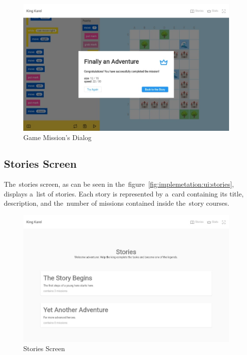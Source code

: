 \begin{figure}
    \centering
    \includegraphics[width=1\linewidth]{assets/implementation/ui/kingkarel_game_mission_dialog.jpeg}
    \caption{Game Mission's Dialog}
    \label{fig:implementation:ui:game-mission-dialog}
\end{figure}

\subsection{Stories Screen}

The~stories screen, as can be seen in the~figure~\ref{fig:implemetation:ui:stories}, displays a~list of stories.
Each story is represented by a~card containing its title, description, and the~number of missions contained inside the~story courses.

\begin{figure}
    \centering
    \includegraphics[width=1\linewidth]{assets/implementation/ui/kingkarel_stories.jpeg}
    \caption{Stories Screen}
    \label{fig:implementation:ui:stories}
\end{figure}

